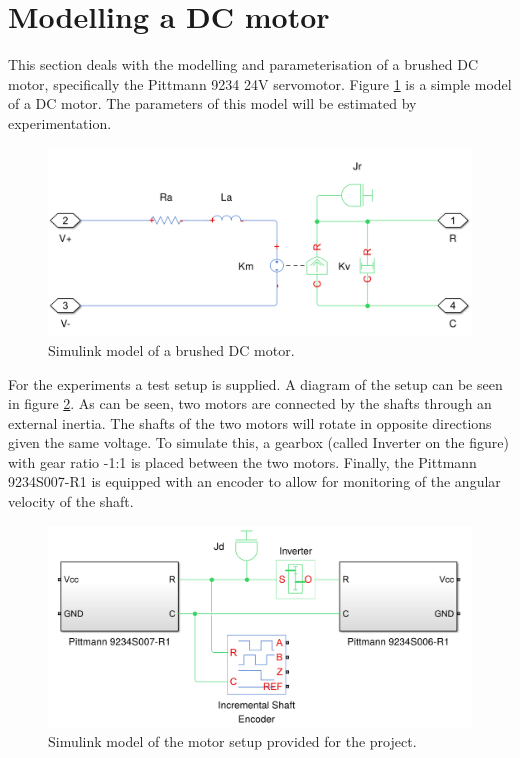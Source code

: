 \section{Modelling a DC motor}
This section deals with the modelling and parameterisation of a brushed DC motor, specifically the Pittmann 9234 24V servomotor.
Figure \ref{fig:dcmotormodel} is a simple model of a DC motor.
The parameters of this model will be estimated by experimentation.


\begin{figure}[!h]
	\centering
	\includegraphics[width=.75\linewidth]{graphics/dcmotormodel.png}
	\caption{Simulink model of a brushed DC motor.}
	\label{fig:dcmotormodel}
\end{figure}

For the experiments a test setup is supplied. 
A diagram of the setup can be seen in figure \ref{fig:motorsetup}. 
As can be seen, two motors are connected by the shafts through an external inertia.
The shafts of the two motors will rotate in opposite directions given the same voltage.
To simulate this, a gearbox (called Inverter on the figure) with gear ratio -1:1 is placed between the two motors.
Finally, the Pittmann 9234S007-R1 is equipped with an encoder to allow for monitoring of the angular velocity of the shaft.


\begin{figure}[!h]
	\centering
	\includegraphics[width=.8\linewidth]{graphics/motorsetup.png}
	\caption{Simulink model of the motor setup provided for the project.}
	\label{fig:motorsetup}
\end{figure}

